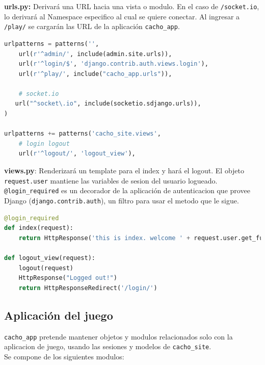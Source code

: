 \documentclass[a4paper,11pt]{article}
\begin{document}
\textbf{urls.py:} Derivará una URL hacia una vista o modulo.
En el caso de \texttt{/socket.io}, lo derivará al Namespace especifico
al cual se quiere conectar. Al ingresar a \texttt{/play/} se cargarán las URL
de la aplicación \texttt{cacho\_app}.
\begin{lstlisting}[language=Python, caption=cacho\_site/urls.py]
urlpatterns = patterns('',
	url(r'^admin/', include(admin.site.urls)),
	url(r'^login/$', 'django.contrib.auth.views.login'),
	url(r'^play/', include("cacho_app.urls")),

	# socket.io
   url("^socket\.io", include(socketio.sdjango.urls)),
)

urlpatterns += patterns('cacho_site.views', 
	# login logout
	url(r'^logout/', 'logout_view'),
\end{lstlisting}
\vspace{1cm}
\textbf{views.py}: Renderizará un template para el index y hará el logout.
El objeto \texttt{request.user} mantiene las variables de sesion del usuario logueado.
\texttt{@login\_required} es un decorador de la aplicación de autenticacion que provee
Django (\texttt{django.contrib.auth}), un filtro para usar el metodo que le sigue.
\begin{lstlisting}[language=Python, caption=cacho\_site/views.py]
@login_required
def index(request):
	return HttpResponse('this is index. welcome ' + request.user.get_full_name())

def logout_view(request):
	logout(request)
	HttpResponse("Logged out!")
	return HttpResponseRedirect('/login/')
\end{lstlisting}

\newpage
\subsection{Aplicación del juego}
\texttt{cacho\_app} pretende mantener objetos y modulos relacionados solo
con la aplicacion de juego, usando las sesiones y modelos de \texttt{cacho\_site}.\\

Se compone de los siguientes modulos:\\
\end{document}
